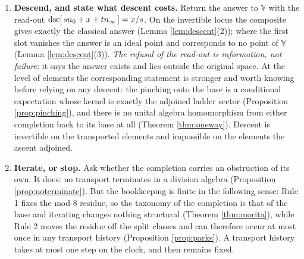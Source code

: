 \begin{enumerate}
\item[\textbf{Step 5.}] \textbf{Descend, and state what descent costs.} Return the answer to $\mathbb{V}$ with the read-out $\mathrm{dsc}[\,sn_0 + x + tn_\infty\,] = x/s$. On the invertible locus the composite gives exactly the classical answer (Lemma \ref{lem:descent}(2)); where the first slot vanishes the answer is an ideal point and corresponds to no point of $\mathbb{V}$ (Lemma \ref{lem:descent}(3)). \emph{The refusal of the read-out is information, not failure}: it says the answer exists and lies outside the original space. At the level of elements the corresponding statement is stronger and worth knowing before relying on any descent: the pinching onto the base is a conditional expectation whose kernel is exactly the adjoined ladder sector (Proposition \ref{prop:pinching}), and there is no unital algebra homomorphism from either completion back to its base at all (Theorem \ref{thm:oneway}). Descent is invertible on the transported elements and impossible on the elements the ascent adjoined.

\item[\textbf{Step 6.}] \textbf{Iterate, or stop.} Ask whether the completion carries an obstruction of its own. It does: no transport terminates in a division algebra (Proposition \ref{prop:noterminate}). But the bookkeeping is finite in the following sense: Rule 1 fixes the mod-8 residue, so the taxonomy of the completion is that of the base and iterating changes nothing structural (Theorem \ref{thm:morita}), while Rule 2 moves the residue off the split classes and can therefore occur at most once in any transport history (Proposition \ref{prop:parks}). A transport history takes at most one step on the clock, and then remains fixed.
\end{enumerate}

